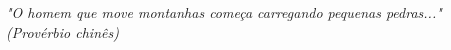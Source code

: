 \begin{epigrafe}[]
    \vspace*{\fill}
	\begin{flushright}
	
		\textit{"O homem que move montanhas começa carregando pequenas pedras..."\\
		(Provérbio chinês)}
		
	\end{flushright}
\end{epigrafe}
